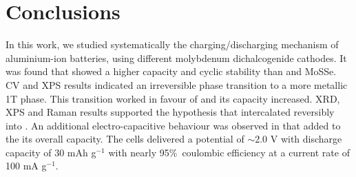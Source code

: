 \section{Conclusions}
In this work, we studied systematically the charging/discharging mechanism of aluminium-ion batteries, using different molybdenum dichalcogenide cathodes. It was found that  showed a higher capacity and cyclic stability than  and MoSSe. CV and XPS results indicated an irreversible phase transition to a more metallic 1T phase. This transition worked in favour of  and its capacity increased. XRD, XPS and Raman results supported the hypothesis that  intercalated reversibly into . An additional electro-capacitive behaviour was observed in  that added to the its overall capacity. The cells delivered a potential of $\sim$2.0 V with discharge capacity of 30 mAh g$^{-1}$ with nearly 95\%\ coulombic efficiency at a current rate of 100 mA g$^{-1}$.



